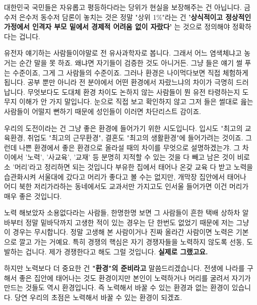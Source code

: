 대한민국 국민들은 자유롭고 평등하다라는 당위가 현실을 보장해주는 건 아닙니다.
금수저 은수저 동수저 담론이 놓치는 것은 정말 "상위 1$\%$"라는 건
\textbf{'상식적이고 정상적인 가정에서 인격자 부모 밑에서 경제적 어려움 없이 자랐다'}
는 것으로 정의해야 정확하다는 겁니다.
\vspace{5mm}

유전자 얘기하는 사람들이야말로 전 유사과학자로 봅니다. 그래서 어느 염색체냐고 농거는 순간 말을 못 하죠.
왜냐면 자기들이 검증한 것도 아니거든. 그냥 들은 얘기 썰 푸는 수준이죠, 그게 그 사람들의 수준이죠.
그러나 환경은 나이먹다보면 직접 체험하게 됩니다. 공부 뿐만 아니라 전 분야에서 어떤 환경에서 자랐느냐의 차이가 극명히 드러납니다.
무엇보다도 도대체 환경 차이도 논하지 않는 사람들이 뭔 유전 타령하는지 도무지 이해가 안 가지 말입니다.
눈으로 직접 보고 확인하지 않고 그저 들은 썰대로 읊는 사람들이 어떨지 뻔하기 때문에 성인들이 이러면 차단리스트 감이죠.
\vspace{5mm}

우리의 도전이라는 건 그냥 좋은 환경에 들어가기 위한 시도입니다.
입시도 "최고의 교육환경, 취업도 "최고의 근무환경", 결혼도 "최고의 생활환경"에 들어가려는 것이죠.
그런데 나쁜 환경에서 좋은 환경으로 올라설 때의 차이를 무엇으로 설명하겠는갸.
그 차이에서 '노력', '사교육', '교재' 등 분명히 지적할 수 있는 것을 다 빼고 남은 것이 비로소 '머리'라고 정리하면 되는 것입니다
부유한 집에서 태어나 온갖 교육 다 받고 노력을 습관화시켜 서울대에 갔다고 머리가 좋다고 볼 수는 없지만,
개막장 집안에서 태어나 어디 북한 저리가라하는 동네에서도 교과서만 가지고도 인서울 들어가면 이건 머리가 매우 좋은 것입니다.
\vspace{5mm}

노력 해보았자 소용없다라는 사람들, 한명한명 보면 그 사람들이 흔한 택배 상하차 알바부터
정말 밑바닥까지 고생한 적이 있는 경우는 단 한번도 없었기 때문에 저는 그냥 이 경우는 무시합니다.
정말 고생해 본 사람이거나 진짜 올라간 사람이면 노력은 기본으로 깔고 가는 거예요.
특히 경쟁의 핵심은 자기 경쟁자들을 노력하지 않도록 선동, 도발하는 겁니다. 제가 경쟁한다고 해도 그럴 것입니다. \textbf{실제로 그랬고요.}
\vspace{5mm}

하지만 노력보다 더 중요한 건 \textbf{"환경"의 준비라고} 말씀드리겠습니다.
전생에 나라를 구해서 좋은 집안에 태어나는 것도 환경이지만   본인이 노력하거나 머리를 굴려서 자기가 만드는 것들도 역시 환경입니다.
즉 노력해서 바꿀 수 있는 환경과 없는 환경이 있습니다.   당연 우리의 초점은 노력해서 바꿀 수 있는 환경이 되겠죠.
\vspace{5mm}

